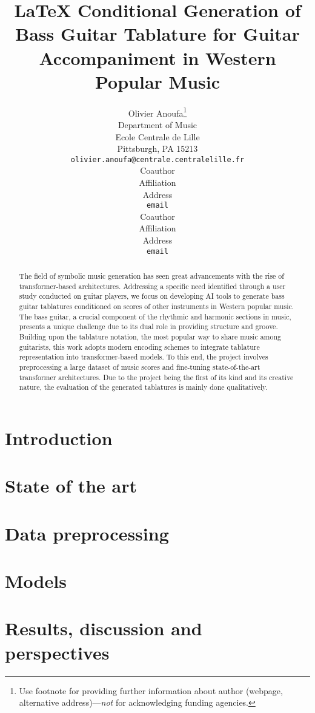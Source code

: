 \documentclass{article}
\title{\LaTeX{} Conditional Generation of Bass Guitar Tablature for Guitar Accompaniment in Western Popular Music}
\author{%
  Olivier Anoufa\thanks{Use footnote for providing further information
    about author (webpage, alternative address)---\emph{not} for acknowledging
    funding agencies.} \\
  Department of Music\\
  Ecole Centrale de Lille\\
  Pittsburgh, PA 15213 \\
  \texttt{olivier.anoufa@centrale.centralelille.fr} \\
  \And
  Coauthor \\
  Affiliation \\
  Address \\
  \texttt{email} \\
  \AND
  Coauthor \\
  Affiliation \\
  Address \\
  \texttt{email} \\
}
\begin{document}
\maketitle

\begin{abstract}
  The field of symbolic music generation has seen great advancements with the rise of transformer-based architectures.
  Addressing a specific need identified through a user study conducted on guitar players, we focus on developing AI tools to generate bass guitar tablatures conditioned on scores of other instruments in Western popular music.
  The bass guitar, a crucial component of the rhythmic and harmonic sections in music, presents a unique challenge due to its dual role in providing structure and groove.
  Building upon the tablature notation, the most popular way to share music among guitarists, this work adopts modern encoding schemes to integrate tablature representation into transformer-based models.
  To this end, the project involves preprocessing a large dataset of music scores and fine-tuning state-of-the-art transformer architectures.
  Due to the project being the first of its kind and its creative nature, the evaluation of the generated tablatures is mainly done qualitatively.
\end{abstract}

\newpage

\section{Introduction}



\section{State of the art}



\section{Data preprocessing}



\section{Models}



\section{Results, discussion and perspectives}



\newpage

   
  
\end{document}
